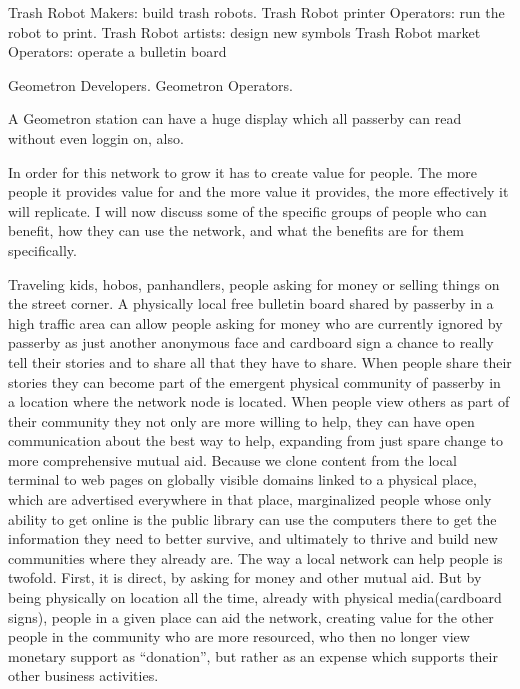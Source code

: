 Trash Robot Makers: build trash robots.
Trash Robot  printer Operators: run the robot to print.
Trash Robot artists: design new symbols
Trash Robot market Operators: operate a bulletin board



Geometron Developers.    Geometron Operators.


A Geometron station can have a huge display which all passerby can read without even loggin on, also.

In order for this network to grow it has to create value for people. The more people it provides value for and the more value it provides, the more effectively it will replicate.  I will now discuss some of the specific groups of people who can benefit, how they can use the network, and what the benefits are for them specifically.

Traveling kids, hobos, panhandlers, people asking for money or selling things on the street corner.  A physically local free bulletin board shared by passerby in a high traffic area can allow people asking for money who are currently ignored by passerby as just another anonymous face and cardboard sign a chance to really tell their stories and to share all that they have to share.  When people share their stories they can become part of the emergent physical community of passerby in a location where the network node is located.  When people view others as part of their community they not only are more willing to help, they can have open communication about the best way to help, expanding from just spare change to more comprehensive mutual aid.  Because we clone content from the local terminal to web pages on globally visible domains linked to a physical place, which are advertised everywhere in that place, marginalized people whose only ability to get online is the public library can use the computers there to get the information they need to better survive, and ultimately to thrive and build new communities where they already are.  The way a local network can help people is twofold. First, it is direct, by asking for money and other mutual aid.  But by being physically on location all the time, already with physical media(cardboard signs), people in a given place can aid the network, creating value for the other people in the community who are more resourced, who then no longer view monetary support as ``donation'', but rather as an expense which supports their other business activities.  

